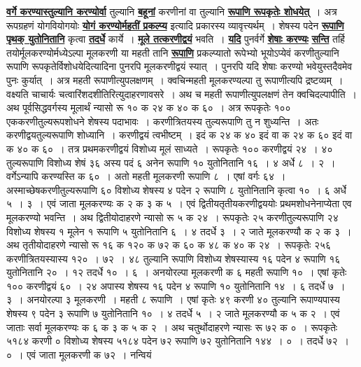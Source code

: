 \documentclass[11pt, openany]{book}
\begin{document}
{{\hyperref[41]{\textbf{वर्गे करण्यास्तुल्यानि करण्योर्वा}} तुल्यानि \hyperref[41]{\textbf{बहूनां}} करणीनां वा तुल्यानि
\hyperref[41]{\textbf{रूपाणि रूपकृतेः शोधयेत्}}~। अत्र रूपग्रहणं योगवियोगयोः \hyperref[34]{\textbf{योगं करण्योर्महतीं प्रकल्प्य}} इत्यादि प्रकारस्य व्यावृत्त्यर्थम्~। शेषस्य पदेन \hyperref[41]{\textbf{रूपाणि पृथक् युतोनितानि}} कृत्वा \hyperref[41]{\textbf{तदर्धे}} कार्ये~। \hyperref[41]{\textbf{मूले तत्करणीद्वयं}} भवति~। \hyperref[41]{\textbf{यदि}} पुनर्वर्गे \hyperref[41]{\textbf{शेषाः करण्यः}}
\newpage 
\noindent \hyperref[41]{\textbf{सन्ति}} तर्हि तयोर्मूलकरण्योर्मध्येऽल्पा मूलकरणी या महती तानि \hyperref[41]{\textbf{रूपाणि}} प्रकल्प्यातो 
रूपेभ्यो भूयोऽप्येवं करणीतुल्यानि रूपाणि रूपकृतेर्विशोधयेदित्यादिना
पुनरपि मूलकरणीद्वयं स्यात्~। पुनरपि यदि शेषाः करण्यो भवेयुस्तदैवमेव पुनः कुर्यात्~। अत्र महती रूपाणीत्युपलक्षणम्~। क्वचिन्महती मूलकरण्यल्पा तु रूपाणीत्यपि
द्रष्टव्यम्~। वक्ष्यति चाचार्यः चत्वारिंशदशीतिरित्युदाहरणावसरे~। अथ च महती
रूपाणीत्युपलक्षणं तेन क्वचिदल्पापीति~। अथ पूर्वसिद्धवर्गस्य मूलार्थं न्यासो रू १० क २४ क ४० क ६०~। अत्र रूपकृतेः १०० एककरणीतुल्यरूपशोधने शेषस्य पदाभावः~। करणीत्रितयस्य तुल्यरूपाणि तु न शुध्यन्ति~। अतः करणीद्वयतुल्यरूपाणि शोध्यानि~। करणीद्वयं त्वभीष्टम्~। इदं क २४ क ४० इदं वा क २४ क ६० इदं वा क ४० क ६०~। तत्र प्रथमकरणीद्वयं विशोध्य मूलं साध्यते~। रूपकृतेः १०० करणीद्वयं २४~। ४० तुल्यरूपाणि विशोध्य शेषं ३६ अस्य पदं ६ अनेन रूपाणि १० युतोनितानि १६~। ४ अर्धे ८~। २~। वर्गेऽन्यापि करण्यस्ति क ६०~। अतो 
महती मूलकरणी रूपाणि ८~। एषां वर्गः ६४~। अस्माच्छेषकरणीतुल्यरूपाणि 
६० विशोध्य शेषस्य ४ पदेन २ रूपाणि ८ युतोनितानि कृत्वा १०~। ६ 
अर्धे ५~। ३~। एवं जाता मूलकरण्यः क २ क ३ क ५~। एवं द्वितीयतृतीयकरणीद्वययोः प्रथमशोधनेनाप्येता एव मूलकरण्यो भवन्ति~। अथ
द्वितीयोदाहरणे न्यासो रू ५ क २४~। रूपकृतेः २५ करणीतुल्यरूपाणि २४ विशोध्य शेषस्य १ मूलेन १ रूपाणि ५ युतोनितानि ६~। ४ तदर्धे ३~। २ जाते मूलकरण्यौ 
क २ क ३~। अथ तृतीयोदाहरणे न्यासो रू १६ क १२० क ७२ क ६० क 
४८ क ४० क २४~। रूपकृतेः २५६ करणीत्रितयस्यास्य १२०~। ७२~। ४८ 
तुल्यानि रूपाणि विशोध्य शेषस्यास्य १६ पदेन ४ रूपाणि १६ युतोनितानि २०~। १२ तदर्धे १०~। ६~। अनयोरल्पा मूलकरणी क ६ 
महती रूपाणि १०~। एषां कृतेः १०० करणीद्वयं ६०~। २४ अपास्य शेषस्य १६ 
पदेन ४ रूपाणि १० युतोनितानि १४~। ६ तदर्धे ७~। ३~। अनयोरल्पा ३ 
मूलकरणी~। महती ८ रूपाणि~। एषां कृतेः ४९ करणी ४० तुल्यानि रूपाण्यपास्य 
शेषस्य ९ पदेन ३ रूपाणि ७ युतोनितानि १०~। ४ तदर्धे ५~। २ जाते मूलकरण्यौ क ५ क २~। एवं जाताः सर्वा मूलकरण्यः क ६ क ३ क ५ क २~। अथ चतुर्थोदाहरणे न्यासः रू ७२ क ०~। रूपकृतेः ५१८४ करणी ० विशोध्य शेषस्य ५१८४ पदेन ७२ रूपाणि ७२ युतोनितानि १४४~। ०~। तदर्धे ७२~। ०~। एवं जाता मूलकरणी क ७२~। नन्वियं
}}
\end{document}
